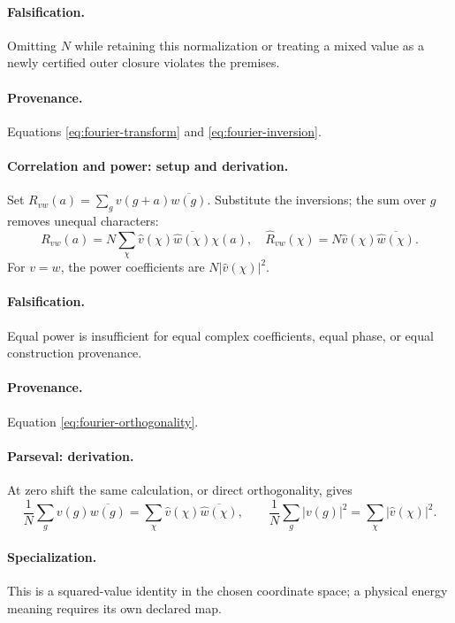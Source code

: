 \paragraph{Falsification.} Omitting \(N\) while retaining this normalization
or treating a mixed value as a newly certified outer closure violates the premises.
\paragraph{Provenance.} Equations \eqref{eq:fourier-transform} and
\eqref{eq:fourier-inversion}.

\paragraph{Correlation and power: setup and derivation.}
Set \(R_{vw}(a)=\sum_g v(g+a)\overline{w(g)}\). Substitute the inversions;
the sum over \(g\) removes unequal characters:
\begin{equation}
R_{vw}(a)=N\sum_\chi\widehat v(\chi)\overline{\widehat w(\chi)}\chi(a),
\quad \widehat R_{vw}(\chi)=N\widehat v(\chi)\overline{\widehat w(\chi)}.
\label{eq:fourier-correlation-power}
\end{equation}
For \(v=w\), the power coefficients are \(N|\widehat v(\chi)|^2\).
\paragraph{Falsification.} Equal power is insufficient for equal complex
coefficients, equal phase, or equal construction provenance.
\paragraph{Provenance.} Equation \eqref{eq:fourier-orthogonality}.

\paragraph{Parseval: derivation.}
At zero shift the same calculation, or direct orthogonality, gives
\begin{equation}
\frac1N\sum_g v(g)\overline{w(g)}
=\sum_\chi\widehat v(\chi)\overline{\widehat w(\chi)},
\qquad \frac1N\sum_g|v(g)|^2=\sum_\chi|\widehat v(\chi)|^2.
\label{eq:fourier-parseval}
\end{equation}
\paragraph{Specialization.} This is a squared-value identity in the chosen
coordinate space; a physical energy meaning requires its own declared map.

